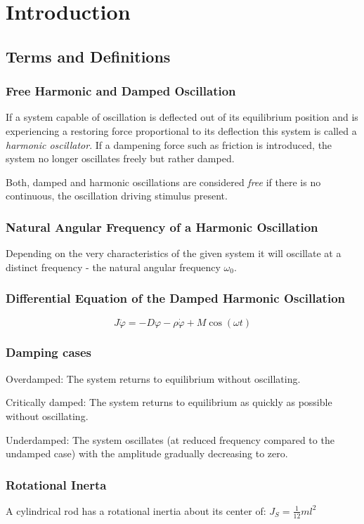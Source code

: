 \chapter{Introduction}
%
\section{Terms and Definitions}
    \subsection*{Free Harmonic and Damped Oscillation}
        If a system capable of oscillation is deflected out of its equilibrium position and is experiencing a restoring force
        proportional to its deflection this system is called a \textit{harmonic oscillator}. If a dampening force such as friction
        is introduced, the system no longer oscillates freely but rather damped.\par
        Both, damped and harmonic oscillations are considered \textit{free} if there is no continuous, the oscillation driving
        stimulus present.
    \subsection*{Natural Angular Frequency of a Harmonic Oscillation}
        Depending on the very characteristics of the given system it will oscillate at a distinct frequency - the natural angular
        frequency \( \omega_0 \).
    \subsection*{Differential Equation of the Damped Harmonic Oscillation}
        \begin{equation}
            J \ddot{\varphi} = -D\varphi -\rho\dot{\varphi}+M\cos(\omega t)
        \end{equation}
    \subsection*{Damping cases}
        Overdamped: The system returns to equilibrium without oscillating.\par
        Critically damped: The system returns to equilibrium as quickly as possible without oscillating.\par
        Underdamped: The system oscillates (at reduced frequency compared to the undamped case) with the amplitude gradually
        decreasing to zero.
    \subsection*{Rotational Inerta}
        A cylindrical rod has a rotational inertia about its center of: \(J_S = \frac{1}{12}ml^2\)
